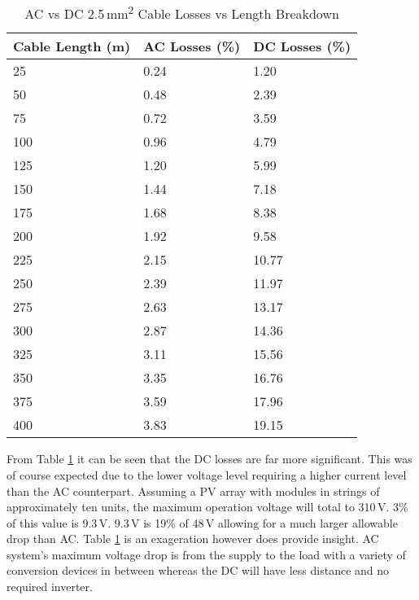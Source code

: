 \begin{table}[H]
	\centering
	\begin{tabular}{|l|l|l|}
		\hline
		\textbf{Cable Length (m)} & \textbf{AC Losses (\%)} & \textbf{DC Losses (\%)} \\ \hline
		25 & 0.24 & 1.20 \\ \hline
		50 & 0.48 & 2.39 \\ \hline
		75 & 0.72 & 3.59 \\ \hline
		100 & 0.96 & 4.79 \\ \hline
		125 & 1.20 & 5.99 \\ \hline
		150 & 1.44 & 7.18 \\ \hline
		175 & 1.68 & 8.38 \\ \hline
		200 & 1.92 & 9.58 \\ \hline
		225 & 2.15 & 10.77 \\ \hline
		250 & 2.39 & 11.97 \\ \hline
		275 & 2.63 & 13.17 \\ \hline
		300 & 2.87 & 14.36 \\ \hline
		325 & 3.11 & 15.56 \\ \hline
		350 & 3.35 & 16.76 \\ \hline
		375 & 3.59 & 17.96 \\ \hline
		400 & 3.83 & 19.15 \\ \hline
	\end{tabular}
	\caption{AC vs DC 2.5\,\si{mm^2} Cable Losses vs Length Breakdown}
	\label{table: AC-vs-DC-lengths}
\end{table} 

From Table \ref{table: AC-vs-DC-lengths} it can be seen that the DC losses are far more significant. This was of course expected due to the lower voltage level requiring a higher current level than the AC counterpart. Assuming a PV array with modules in strings of approximately ten units, the maximum operation voltage will total to 310\,V. 3\% of this value is 9.3\,V. 9.3\,V is 19\% of 48\,V allowing for a much larger allowable drop than AC. Table \ref{table: AC-vs-DC-lengths} is an exageration however does provide insight. AC system's maximum voltage drop is from the supply to the load with a variety of conversion devices in between whereas the DC will have less distance and no required inverter.         